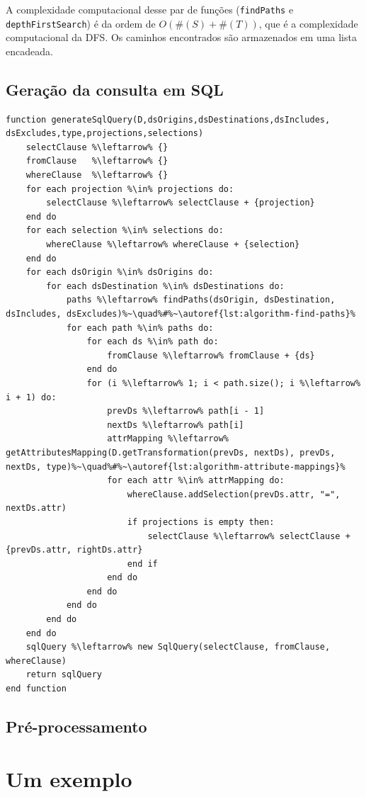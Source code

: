 A complexidade computacional desse par de funções (\texttt{findPaths} e \texttt{depthFirstSearch}) é da ordem de \(O(\#(S) + \#(T))\), que é a complexidade computacional da DFS. Os caminhos encontrados são armazenados em uma lista encadeada.

\subsection{Geração da consulta em SQL}


\begin{minipage}[c]{0.95\textwidth}
\begin{lstlisting}[language=pseudocode,label={lst:algorithm-generate-sql-query},caption={[Geração da consulta em SQL]Geração da consulta na linguagem SQL a partir das especificações do usuário.}]
function generateSqlQuery(D,dsOrigins,dsDestinations,dsIncludes, dsExcludes,type,projections,selections)
    selectClause %\leftarrow% {}
    fromClause   %\leftarrow% {}
    whereClause  %\leftarrow% {}
    for each projection %\in% projections do:
        selectClause %\leftarrow% selectClause + {projection}
    end do
    for each selection %\in% selections do:
        whereClause %\leftarrow% whereClause + {selection}
    end do
    for each dsOrigin %\in% dsOrigins do:
        for each dsDestination %\in% dsDestinations do:
            paths %\leftarrow% findPaths(dsOrigin, dsDestination, dsIncludes, dsExcludes)%~\quad%#%~\autoref{lst:algorithm-find-paths}%
            for each path %\in% paths do:
                for each ds %\in% path do:
                    fromClause %\leftarrow% fromClause + {ds}
                end do                
                for (i %\leftarrow% 1; i < path.size(); i %\leftarrow% i + 1) do:
                    prevDs %\leftarrow% path[i - 1]
                    nextDs %\leftarrow% path[i]
                    attrMapping %\leftarrow% getAttributesMapping(D.getTransformation(prevDs, nextDs), prevDs, nextDs, type)%~\quad%#%~\autoref{lst:algorithm-attribute-mappings}%
                    for each attr %\in% attrMapping do:
                        whereClause.addSelection(prevDs.attr, "=", nextDs.attr)
                        if projections is empty then:
                            selectClause %\leftarrow% selectClause + {prevDs.attr, rightDs.attr}
                        end if
                    end do
                end do
            end do
        end do
    end do
    sqlQuery %\leftarrow% new SqlQuery(selectClause, fromClause, whereClause)
    return sqlQuery
end function
\end{lstlisting}
\end{minipage}

\subsection{Pré-processamento}%
\label{subsec:preprocessamento}

\section{Um exemplo}

